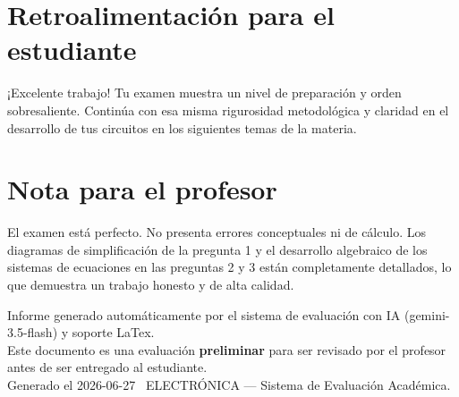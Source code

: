 \documentclass[11pt,a4paper]{article}
\begin{document}
\section*{Retroalimentación para el estudiante}
\begin{tcolorbox}[cajaRecomendacion, title={Dirigido a: Tirzo Mata}]
¡Excelente trabajo! Tu examen muestra un nivel de preparación y orden sobresaliente. Continúa con esa misma rigurosidad metodológica y claridad en el desarrollo de tus circuitos en los siguientes temas de la materia.
\end{tcolorbox}

\section*{Nota para el profesor}
\begin{tcolorbox}[
  enhanced, breakable,
  colback=yellow!8, colframe=yellow!60!black,
  fonttitle=\bfseries, coltitle=black,
  title={Observaciones para revisión manual},
  top=4pt, bottom=4pt, left=8pt, right=8pt,
]
El examen está perfecto. No presenta errores conceptuales ni de cálculo. Los diagramas de simplificación de la pregunta 1 y el desarrollo algebraico de los sistemas de ecuaciones en las preguntas 2 y 3 están completamente detallados, lo que demuestra un trabajo honesto y de alta calidad.
\end{tcolorbox}

\vspace{12pt}
\begin{center}
  \footnotesize\color{gray}
  Informe generado automáticamente por el sistema de evaluación con IA (gemini-3.5-flash) y soporte LaTex. \\
  Este documento es una evaluación \textbf{preliminar} para ser revisado por el profesor antes de ser entregado al 
  estudiante. \\
  Generado el 2026-06-27 \textbullet\ ELECTRÓNICA --- Sistema de Evaluación Académica.
  \end{center}
\end{document}
